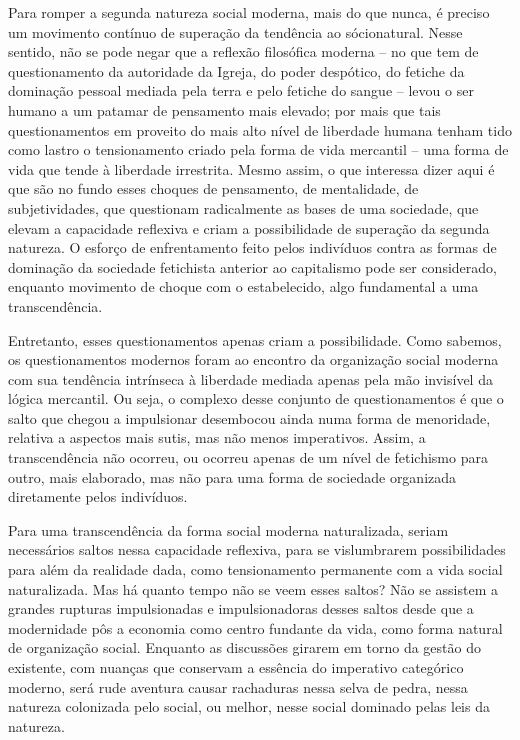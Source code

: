 {Para romper a segunda natureza social moderna, mais do que nunca, é
preciso um movimento contínuo de superação da tendência ao sócionatural.
Nesse sentido, não se pode negar que a reflexão filosófica moderna -- no
que tem de questionamento da autoridade da Igreja, do poder despótico,
do fetiche da dominação pessoal mediada pela terra e pelo fetiche do
sangue -- levou o ser humano a um patamar de pensamento mais elevado;
por mais que tais questionamentos em proveito do mais alto nível de
liberdade humana tenham tido como lastro o tensionamento criado pela
forma de vida mercantil -- uma forma de vida que tende à liberdade
irrestrita. Mesmo assim, o que interessa dizer aqui é que são no fundo
esses choques de pensamento, de mentalidade, de subjetividades, que
questionam radicalmente as bases de uma sociedade, que elevam a
capacidade reflexiva e criam a possibilidade de superação da segunda
natureza. O esforço de enfrentamento feito pelos indivíduos contra as
formas de dominação da sociedade fetichista anterior ao capitalismo pode
ser considerado, enquanto movimento de choque com o estabelecido, algo
fundamental a uma transcendência.

Entretanto, esses questionamentos apenas criam a possibilidade. Como
sabemos, os questionamentos modernos foram ao encontro da organização
social moderna com sua tendência intrínseca à liberdade mediada apenas
pela mão invisível da lógica mercantil. Ou seja, o complexo desse
conjunto de questionamentos é que o salto que chegou a impulsionar
desembocou ainda numa forma de menoridade, relativa a aspectos mais
sutis, mas não menos imperativos. Assim, a transcendência não ocorreu,
ou ocorreu apenas de um nível de fetichismo para outro, mais elaborado,
mas não para uma forma de sociedade organizada diretamente pelos
indivíduos.

Para uma transcendência da forma social moderna naturalizada, seriam
necessários saltos nessa capacidade reflexiva, para se vislumbrarem
possibilidades para além da realidade dada, como tensionamento
permanente com a vida social naturalizada. Mas há quanto tempo não se
veem esses saltos? Não se assistem a grandes rupturas impulsionadas e
impulsionadoras desses saltos desde que a modernidade pôs a economia
como centro fundante da vida, como forma natural de organização social.
Enquanto as discussões girarem em torno da gestão do existente, com
nuanças que conservam a essência do imperativo categórico moderno, será
rude aventura causar rachaduras nessa selva de pedra, nessa natureza
colonizada pelo social, ou melhor, nesse social dominado pelas leis da
natureza.

}
